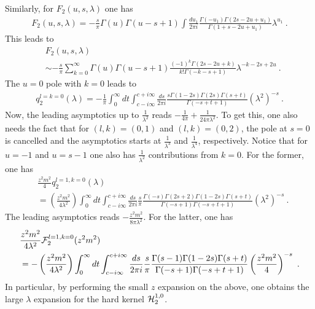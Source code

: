 \documentclass[a4paper,11pt]{article}
\begin{document}
Similarly, for $F_2(u,s,\lambda)$ one has 
\begin{align}
F_2(u,s,\lambda)=-\frac{s}{\pi}\Gamma(u)\Gamma(u-s+1) \int\frac{du_1}{2\pi i}\frac{\Gamma(-u_1)\Gamma(2s-2u+u_1)}{\Gamma(1+s-2u+u_1)}\lambda^{u_1} \ .
\end{align}
This leads to
\begin{align}
&F_2(u,s,\lambda) \nonumber \\
&\sim -\frac{s}{\pi}\sum_{k=0}^{\infty}\Gamma(u)\Gamma(u-s+1)\frac{(-1)^k\Gamma(2s-2u+k)}{k!\Gamma(-k-s+1)}\lambda^{-k-2s+2u} \ .
\end{align}
The $u=0$ pole with $k=0$ leads to
\begin{align}
q_2^{l=k=0}(\lambda)=-\frac{1}{\pi}\int_{0}^{\infty} dt \int_{c-i\infty}^{c+i\infty} \frac{ds}{2\pi i}\frac{s\Gamma (1-2 s)  \Gamma(2s)\Gamma (s+t)}{\Gamma (-s+t+1)}\left(\lambda^2\right)^{-s} \ .
\end{align}
Now, the leading asymptotics up to $\frac{1}{\lambda^2}$ reads $-\frac{1}{4\pi}+\frac{1}{24\pi \lambda^2}$. To get this, one also needs the fact that for $(l,k)=(0,1)$ and $(l,k)=(0,2)$, the pole at $s=0$ is cancelled and the asymptotics starts at $\frac{1}{\lambda^3}$ and $\frac{1}{\lambda^4}$, respectively.  Notice that for $u=-1$ and $u=s-1$ one also has $\frac{1}{\lambda^2}$ contributions from $k=0$. For the former, one has
\begin{align}
&\frac{z^2m^2}{4}q^{l=1,k=0}_2(\lambda)\nonumber \\ 
&=\left(\frac{z^2m^2}{4\lambda^2}\right)\int_{0}^{\infty} dt \int_{c-i\infty}^{c+i\infty} \frac{ds}{2\pi i}\frac{s}{\pi}\frac{\Gamma(-s)\Gamma(2s+2)\Gamma(1-2s)\Gamma(s+t)}{\Gamma(-s+1)\Gamma(-s+t+1)}(\lambda^2)^{-s} \ .
\end{align}
The leading asymptotics reads $-\frac{z^2m^2}{8\pi \lambda^2}$.  For the latter, one has
\begin{align}
&\frac{z^2m^2}{4\lambda^2}{\cal F}_2^{l=1,k=0}(z^2m^2)\nonumber \\ 
&=-\left(\frac{z^2m^2}{4\lambda^2}\right)\int_{0}^{\infty} dt \int_{c-i\infty}^{c+i\infty} \frac{ds}{2\pi i}\frac{s}{\pi}\frac{\Gamma(s-1)\Gamma(1-2s)\Gamma(s+t)}{\Gamma(-s+1)\Gamma(-s+t+1)}\left(\frac{z^2m^2}{4}\right)^{-s} \ .
\end{align}
In particular, by performing the small $z$ expansion on the above, one obtains the large $\lambda$ expansion for the hard kernel ${\cal H}_2^{1,0}$.
\end{document}
